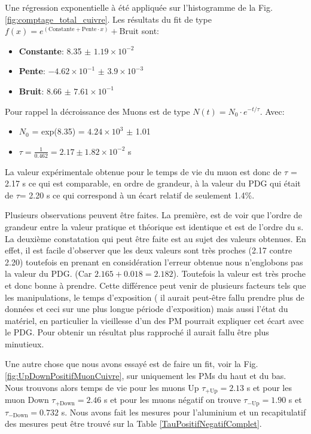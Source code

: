 \documentclass[12pt]{article}
\begin{document}
Une régression exponentielle à été appliquée sur l'histogramme de la Fig. \ref{fig:comptage_total_cuivre}. Les résultats du fit de type $f(x) = e^{(\text{Constante}+\text{Pente}\cdot x)}+\text{Bruit}$ sont:
    \begin{itemize}
        \item \textbf{Constante}: 8.35 $\pm$ $1.19\times10^{-2}$
        \item \textbf{Pente}: $-4.62\times10^{-1}$ $\pm$ $3.9\times10^{-3}$
        \item \textbf{Bruit}: 8.66 $\pm$ $7.61\times10^{-1}$
    \end{itemize}
    
Pour rappel la décroissance des Muons est de type $N(t) = N_{0}\cdot e^{-t/\tau}$. Avec:
    \begin{itemize}
        \item $N_{0}$ = exp(8.35) = $4.24\times10^{3}$ $\pm$ 1.01
        \item $\tau=\frac{1}{0.462} = 2.17 \pm 1.82\times10^{-2}$ \SIUnitSymbolMicro s
    \end{itemize}

La valeur expérimentale obtenue pour le temps de vie du muon est donc de $\tau$ = 2.17 \SIUnitSymbolMicro s ce qui est comparable, en ordre de grandeur, à la valeur du PDG qui était de $\tau$= 2.20 \SIUnitSymbolMicro s ce qui correspond à un écart relatif de seulement 1.4\%.

Plusieurs observations peuvent être faites. La première, est de voir que l'ordre de grandeur entre la valeur pratique et théorique est identique et est de l'ordre du \SIUnitSymbolMicro s. La deuxième constatation qui peut être faite est au sujet des valeurs obtenues. En effet, il est facile d'observer que les deux valeurs sont très proches (2.17 contre 2.20) toutefois en prenant en considération l'erreur obtenue nous n'englobons pas la valeur du PDG. (Car $2.165+0.018=2.182$). Toutefois la valeur est très proche et donc bonne à prendre. Cette différence peut venir de plusieurs facteurs tels que les manipulations, le temps d'exposition ( il aurait peut-être fallu prendre plus de données et ceci sur une plus longue période d'exposition) mais aussi l'état du matériel, en particulier la vieillesse d'un des PM pourrait expliquer cet écart avec le PDG. Pour obtenir un résultat plus rapproché il aurait fallu être plus minutieux. 

Une autre chose que nous avons essayé est de faire un fit, voir la Fig. \ref{fig:UpDownPositifMuonCuivre}, sur uniquement les PMs du haut et du bas. Nous trouvons alors temps de vie pour les muons Up
$\tau_{+\text{Up}}=2.13$ \SIUnitSymbolMicro s et pour les muon  Down $\tau_{+\text{Down}}=2.46$ \SIUnitSymbolMicro s et pour les muons négatif on trouve $\tau_{-\text{Up}}=1.90$ \SIUnitSymbolMicro s et $\tau_{-\text{Down}}=0.732$ \SIUnitSymbolMicro s. Nous avons fait les mesures pour l'aluminium et un recapitulatif des mesures peut être trouvé sur la Table \ref{TauPositifNegatifComplet}.
\end{document}
